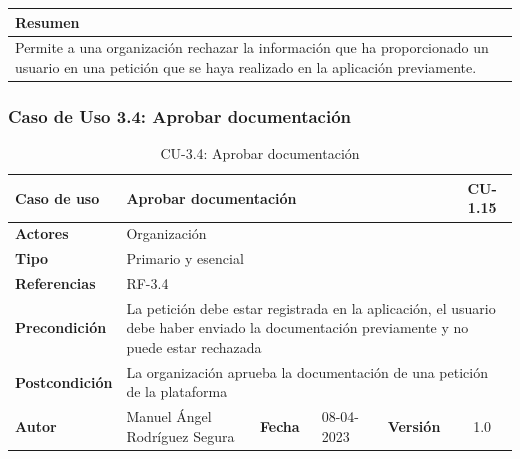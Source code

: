 \begin{table}[H]
    \centering
    \begin{tabularx}{\textwidth}{@{} |L |@{}} \hline
        \textbf{Resumen} \\
        \hline
        Permite a una organización rechazar la información que ha proporcionado un usuario en una petición que se haya
    realizado en la aplicación previamente. \\
        \hline
    \end{tabularx}
\end{table}

\newpage

\subsubsection{Caso de Uso 3.4: Aprobar documentación}\label{subsubsec:aprobar-documentacion}

\begin{table}[H]
    \begin{center}
        \begin{adjustbox}{width=\textwidth}
            \begin{tabular}{ | l | l | l | l | c | c | }
                \hline
                \textbf{Caso de uso} & \multicolumn{4}{l|}{Aprobar documentación} & \cellcolor{gray!50} \textbf{CU-1.15}\\
                \hline
                \textbf{Actores} & \multicolumn{5}{p{0.5\linewidth}|}{Organización} \\
                \hline
                \textbf{Tipo} & \multicolumn{5}{l|}{Primario y esencial} \\
                \hline
                \textbf{Referencias} & \multicolumn{3}{l|}{RF-3.4} & \multicolumn{2}{l|}{ }\\
                \hline
                \textbf{Precondición} & \multicolumn{5}{l|}{La petición debe estar registrada en la aplicación,
                el usuario debe haber enviado la documentación previamente y no puede estar rechazada} \\
                \hline
                \textbf{Postcondición} & \multicolumn{5}{l|}{La organización aprueba la documentación de una petición de la plataforma} \\
                \hline
                \textbf{Autor} & \multicolumn{1}{p{0.25\linewidth}|}{Manuel Ángel Rodríguez Segura} & \textbf{Fecha} &
                08-04-2023     & \textbf{Versión}                                                      & 1.0\\
                \hline
            \end{tabular}
        \end{adjustbox}
        \caption{CU-3.4: Aprobar documentación}
        \label{tab:aprobar-documentacion}
    \end{center}
\end{table}

